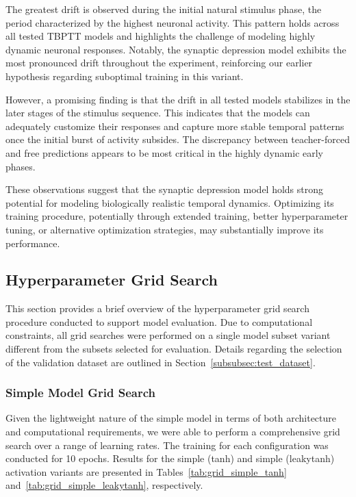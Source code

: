 The greatest drift is observed during the initial natural stimulus phase, the period characterized by the highest neuronal activity. This pattern holds across all tested TBPTT models and highlights the challenge of modeling highly dynamic neuronal responses. Notably, the synaptic depression model exhibits the most pronounced drift throughout the experiment, reinforcing our earlier hypothesis regarding suboptimal training in this variant.

However, a promising finding is that the drift in all tested models stabilizes in the later stages of the stimulus sequence. This indicates that the models can adequately customize their responses and capture more stable temporal patterns once the initial burst of activity subsides. The discrepancy between teacher-forced and free predictions appears to be most critical in the highly dynamic early phases.

These observations suggest that the synaptic depression model holds strong potential for modeling biologically realistic temporal dynamics. Optimizing its training procedure, potentially through extended training, better hyperparameter tuning, or alternative optimization strategies, may substantially improve its performance.

\subsection{Hyperparameter Grid Search}
\label{subsec:hyperparameter_grid_search}

This section provides a brief overview of the hyperparameter grid search procedure conducted to support model evaluation. Due to computational constraints, all grid searches were performed on a single model subset variant different from the subsets selected for evaluation. Details regarding the selection of the validation dataset are outlined in Section~\ref{subsubsec:test_dataset}.

\subsubsection{Simple Model Grid Search}
\label{subsubsec:simple_model_grid_search}

Given the lightweight nature of the simple model in terms of both architecture and computational requirements, we were able to perform a comprehensive grid search over a range of learning rates. The training for each configuration was conducted for 10 epochs. Results for the simple (tanh) and simple (leakytanh) activation variants are presented in Tables~\ref{tab:grid_simple_tanh} and~\ref{tab:grid_simple_leakytanh}, respectively.

